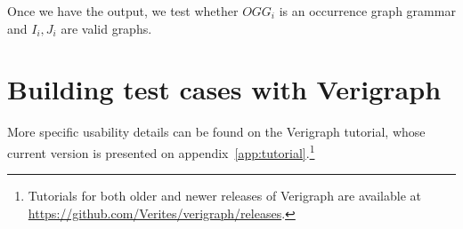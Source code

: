 \begin{example}
\end{example}

\begin{example}
\end{example}

Once we have the output, we test whether $OGG_i$ is an occurrence graph grammar and $I_i, J_i$ are valid graphs.

\begin{example}[]
\end{example}

\section{Building test cases with Verigraph}

More specific usability details can be found on the Verigraph tutorial, whose current version is presented on appendix~\ref{app:tutorial}.\footnote{Tutorials for both older and newer releases of Verigraph are available at \url{https://github.com/Verites/verigraph/releases}.}
